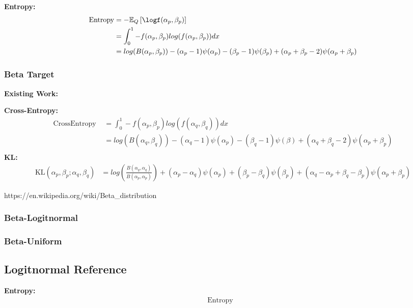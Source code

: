 \documentclass{article}
\begin{document}
\noindent \textbf{Entropy:}
$$ \begin{aligned} \text{Entropy}&=-\mathbb{E}_{Q}\left[\logf(\alpha_{p},\beta_{p})\right]\\&=\int_{0}^{1}-f(\alpha_{p},\beta_{p})log(f(\alpha_{p},\beta_{p}))dx\\&=log(B(\alpha_{p},\beta_{p}))-(\alpha_{p}-1)\psi(\alpha_{p})-(\beta_{p}-1)\psi(\beta_{p})+(\alpha_{p}+\beta_{p}-2)\psi(\alpha_{p}+\beta_{p})
\end{aligned} $$

\subsubsection{Beta Target}

\noindent \textbf{Existing Work:}

\noindent \textbf{Cross-Entropy:}
$$ \begin{aligned} \text {CrossEntropy }&=\int_{0}^{1}-f(\alpha_{p},\beta_{p})log(f(\alpha_{q},\beta_{q}))dx\\ &=log(B(\alpha_{q},\beta_{q}))-(\alpha_{q}-1)\psi(\alpha_{p})-(\beta_{q}-1)\psi(\beta)+(\alpha_{q}+\beta_{q}-2)\psi(\alpha_{p}+\beta_{p})\\
\end{aligned} $$
\noindent \textbf{KL:}
$$ \begin{aligned}
\mathrm{KL}\left(\alpha_{p}, \beta_{p} ; \alpha_{q}, \beta_{q}\right)&=
log(\frac{B(\alpha_{q},\alpha_{q})}{B(\alpha_{p},\alpha_{p})})+(\alpha_{p}-\alpha_{q})\psi(\alpha_{p})+(\beta_{p}-\beta_{q})\psi(\beta_{p})+(\alpha_{q}-\alpha_{p}+\beta_{q}-\beta_{p})\psi(\alpha_{p}+\beta_{p})
\end{aligned} $$

https://en.wikipedia.org/wiki/Beta\_distribution

\subsubsection{Beta-Logitnormal}
\subsubsection{Beta-Uniform}


\subsection{Logitnormal Reference}

\noindent \textbf{Entropy:}
$$ \begin{aligned} \text { Entropy }&
\end{aligned} $$
\end{document}
